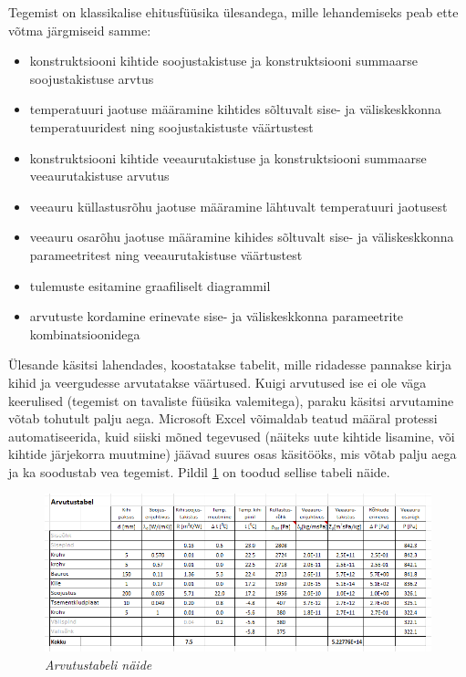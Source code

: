 Tegemist on klassikalise ehitusfüüsika ülesandega, mille lehandemiseks peab ette võtma järgmiseid samme:
\begin{itemize}
    \item konstruktsiooni kihtide soojustakistuse ja konstruktsiooni summaarse soojustakistuse arvtus
    \item temperatuuri jaotuse määramine kihtides sõltuvalt sise- ja väliskeskkonna temperatuuridest ning 
    soojustakistuste väärtustest
    \item konstruktsiooni kihtide veeaurutakistuse ja konstruktsiooni summaarse veeaurutakistuse arvutus
    \item veeauru küllastusrõhu jaotuse määramine lähtuvalt temperatuuri jaotusest
    \item veeauru osarõhu jaotuse määramine kihides sõltuvalt sise- ja väliskeskkonna parameetritest ning 
    veeaurutakistuse väärtustest
    \item tulemuste esitamine graafiliselt diagrammil
    \item arvutuste kordamine erinevate sise- ja väliskeskkonna parameetrite kombinatsioonidega
\end{itemize}

Ülesande käsitsi lahendades, koostatakse tabelit, mille ridadesse pannakse kirja kihid ja veergudesse arvutatakse 
väärtused. Kuigi arvutused ise ei ole väga keerulised (tegemist on tavaliste füüsika valemitega), paraku käsitsi arvutamine 
võtab tohutult palju aega. Microsoft Excel võimaldab teatud määral protessi automatiseerida, kuid siiski mõned 
tegevused (näiteks uute kihtide lisamine, või kihtide järjekorra muutmine) jäävad suures osas käsitööks, mis võtab palju 
aega ja ka soodustab vea tegemist. Pildil \ref{fig:excel_table_sample} on toodud sellise tabeli näide.
\begin{figure}[ht]
    \centering
    \includegraphics[width=.8\textwidth]{figures/problem_statement/04_calc_table.png}
    \caption{\textit{Arvutustabeli näide}}
    \label{fig:excel_table_sample}
\end{figure}

